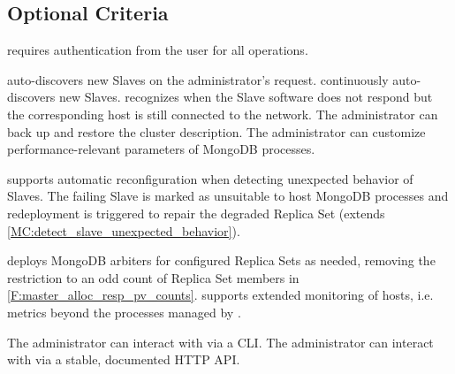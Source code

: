 \subsection{Optional Criteria}\label{OptionalCriteria}
\begin{description}
	
	 \mamid requires authentication from the user for all operations.
	
	 \mamid auto-discovers new Slaves on the administrator's request. \notdone
	 \mamid continuously auto-discovers new Slaves. \notdone
	 \mamid recognizes when the Slave software does not respond but the corresponding host is still 
	connected to the network.  \notdone
	 The administrator can back up and restore the cluster description. %
	 The administrator can customize performance-relevant parameters of MongoDB 
	processes. \notdone
	
	 \mamid supports automatic reconfiguration when detecting unexpected behavior of Slaves. The failing 
	Slave is marked as unsuitable to host MongoDB processes and redeployment is triggered to repair the degraded Replica 
	Set (extends \ref{MC:detect_slave_unexpected_behavior}). \notdone
	
	 \mamid deploys MongoDB arbiters for configured Replica Sets as needed, removing the 
		restriction to an odd count of Replica Set members in \ref{F:master_alloc_resp_pv_counts}.
	 \mamid supports extended monitoring of hosts, i.e. metrics beyond the processes managed by \mamid.  
	\notdone
	
	 The administrator can interact with \mamid via a CLI.  \notdone
	 The administrator can interact with \mamid via a stable, documented HTTP API. \done
\end{description}

